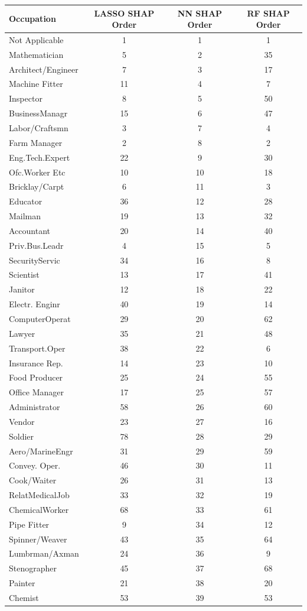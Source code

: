 \begin{tabular}{lccc}
\hline\hline
Occupation & LASSO SHAP Order & NN SHAP Order & RF SHAP Order \\
\hline
Not Applicable&1&1&1\\
Mathematician&5&2&35\\
Architect/Engineer&7&3&17\\
Machine Fitter&11&4&7\\
Inspector&8&5&50\\
BusinessManagr&15&6&47\\
Labor/Craftsmn&3&7&4\\
Farm Manager&2&8&2\\
Eng.Tech.Expert&22&9&30\\
Ofc.Worker Etc&10&10&18\\
Bricklay/Carpt&6&11&3\\
Educator&36&12&28\\
Mailman&19&13&32\\
Accountant&20&14&40\\
Priv.Bus.Leadr&4&15&5\\
SecurityServic&34&16&8\\
Scientist&13&17&41\\
Janitor&12&18&22\\
Electr. Enginr&40&19&14\\
ComputerOperat&29&20&62\\
Lawyer&35&21&48\\
Transport.Oper&38&22&6\\
Insurance Rep.&14&23&10\\
Food Producer&25&24&55\\
Office Manager&17&25&57\\
Administrator&58&26&60\\
Vendor&23&27&16\\
Soldier&78&28&29\\
Aero/MarineEngr&31&29&59\\
Convey. Oper.&46&30&11\\
Cook/Waiter&26&31&13\\
RelatMedicalJob&33&32&19\\
ChemicalWorker&68&33&61\\
Pipe Fitter&9&34&12\\
Spinner/Weaver&43&35&64\\
Lumbrman/Axman&24&36&9\\
Stenographer&45&37&68\\
Painter&21&38&20\\
Chemist&53&39&53\\

\end{tabular}
